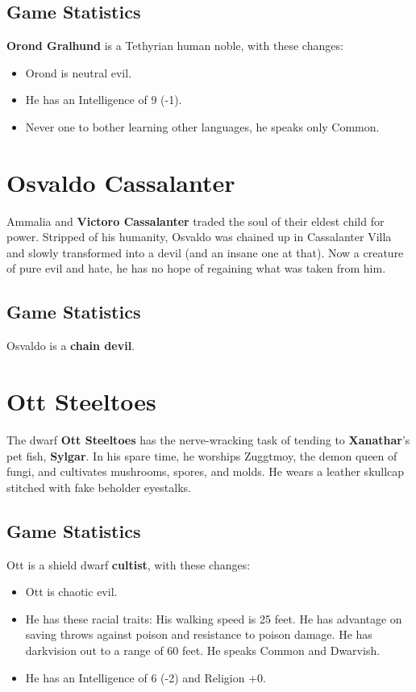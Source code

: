 \documentclass[10pt,a4paper,twoside,twocolumn,openany,nodeprecatedcode]{dndbook}
\begin{document}
\subsection{Game Statistics}
\textbf{Orond Gralhund} is a Tethyrian human noble, with these changes:
\begin{itemize}

\item Orond is neutral evil.
\item He has an Intelligence of 9 (-1).
\item Never one to bother learning other languages, he speaks only Common.
\end{itemize}


\section{Osvaldo Cassalanter}
Ammalia and \textbf{Victoro Cassalanter} traded the soul of their eldest child for power. Stripped of his humanity, Osvaldo was chained up in Cassalanter Villa and slowly transformed into a devil (and an insane one at that). Now a creature of pure evil and hate, he has no hope of regaining what was taken from him.
\subsection{Game Statistics}
Osvaldo is a \textbf{chain devil}.
\section{Ott Steeltoes}
The dwarf \textbf{Ott Steeltoes} has the nerve-wracking task of tending to \textbf{Xanathar}'s pet fish, \textbf{Sylgar}. In his spare time, he worships Zuggtmoy, the demon queen of fungi, and cultivates mushrooms, spores, and molds. He wears a leather skullcap stitched with fake beholder eyestalks.
\subsection{Game Statistics}
Ott is a shield dwarf \textbf{cultist}, with these changes:
\begin{itemize}

\item Ott is chaotic evil.
\item He has these racial traits: His walking speed is 25 feet. He has advantage on saving throws against poison and resistance to poison damage. He has darkvision out to a range of 60 feet. He speaks Common and Dwarvish.
\item He has an Intelligence of 6 (-2) and Religion +0.
\end{itemize}
\end{document}
